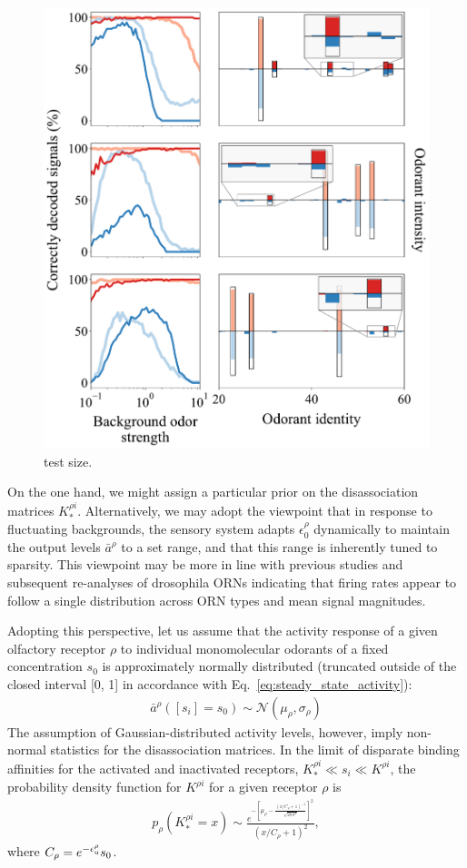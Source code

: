 \documentclass[9pt,twocolumn,twoside]{pnas-new}
\begin{document}
\begin{figure}%
	\centering
	\includegraphics[width=.85\linewidth]{figures/signal_discrimination_weber_law/signal_discrimination_weber_law}
	\caption{test size.}
	\label{fig:frog}
\end{figure}

On the one hand, we might assign a particular prior on the disassociation matrices $K_*^{\rho i}$. Alternatively, we may adopt the viewpoint that in response to fluctuating backgrounds, the sensory system adapts $\epsilon^\rho_0$ dynamically to maintain the output levels $\bar a^\rho$ to a set range, and that this range is inherently tuned to sparsity. This viewpoint may be more in line with previous studies and subsequent re-analyses of drosophila ORNs indicating that firing rates appear to follow a single distribution across ORN types and mean signal magnitudes. 

Adopting this perspective, let us assume that the activity response of a given olfactory receptor $\rho$ to individual monomolecular odorants of a fixed concentration $s_0$ is approximately normally distributed (truncated outside of the closed interval [0, 1] in accordance with Eq.~\ref{eq:steady_state_activity}):
\begin{align}
\bar a^\rho([s_i] = s_0) \sim \mathcal N(\mu_\rho, \sigma_\rho)
\label{eq:monomolecular_activity_levels}
\end{align} 
The assumption of Gaussian-distributed activity levels, however, imply non-normal statistics for the disassociation matrices. In the limit of disparate binding affinities for the activated and inactivated receptors, $K^{\rho i}_* \ll s_i \ll K^{\rho i}$, the probability density function for $K^{\rho i}$ for a given receptor $\rho$ is
\begin{align}
p_\rho(K_*^{\rho i} = x)  \sim \frac{e^{-\left[\mu_\rho - \frac{(x/C_\rho + 1)^{-1}}{\sqrt{2\pi \sigma^2}}\right]^2}}{(x/C_\rho + 1)^2}, 
\label{eq:distribution_Kk2_normal_activity}
\end{align}
where $C_\rho = e^{-\epsilon_{\text u}^\rho}s_0$. 
\end{document}
